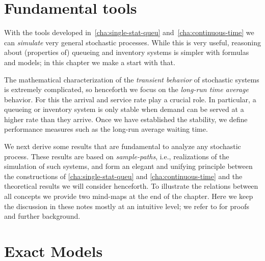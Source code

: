 






% 




\chapter{Fundamental tools}
\label{cha:fundamental-tools}

With the tools developed in~\cref{cha:single-stat-queu} and~\cref{cha:continuous-time} we can \emph{simulate} very general stochastic processes.
While this is very useful, reasoning about (properties of) queueing and inventory systems is simpler with formulas and models;  in this chapter we make a start with that.

The mathematical characterization of the \emph{transient behavior} of stochastic systems is extremely complicated, so henceforth we focus on the \emph{long-run time average} behavior. For this the arrival and service rate play a crucial role. %
In particular, a queueing or inventory system is only stable when demand can be served at a higher rate than they arrive.
Once we have established the stability, we  define performance measures such as the long-run average waiting time.

We next derive some results that are fundamental to analyze any stochastic process.
These results are based on \emph{sample-paths}, i.e., realizations of the simulation of such systems, and form an elegant and unifying principle between the constructions of \cref{cha:single-stat-queu} and \cref{cha:continuous-time} and the theoretical results we will consider henceforth.
To illustrate the relations between all concepts we provide two mind-maps at the end of the chapter.
Here we keep the discussion in these notes mostly at an intuitive level; we refer to \cite{el-taha98:_sampl_path_analy_queuein_system} for proofs and further background.










\chapter{Exact Models}
\label{cha:analytical-models}

